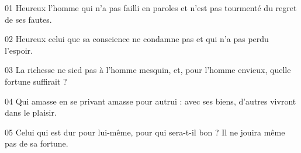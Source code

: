 01 Heureux l’homme qui n’a pas failli en paroles et n’est pas tourmenté du regret de ses fautes.

02 Heureux celui que sa conscience ne condamne pas et qui n’a pas perdu l’espoir.

03 La richesse ne sied pas à l’homme mesquin, et, pour l’homme envieux, quelle fortune suffirait ?

04 Qui amasse en se privant amasse pour autrui : avec ses biens, d’autres vivront dans le plaisir.

05 Celui qui est dur pour lui-même, pour qui sera-t-il bon ? Il ne jouira même pas de sa fortune.
